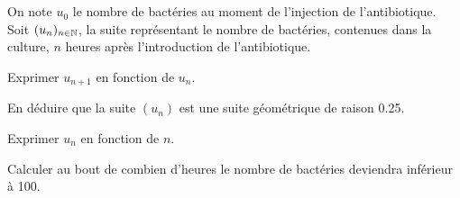 \subsection{\ }

On note $u_0$ le nombre de bactéries au moment de l'injection de l'antibiotique.
Soit $(u_n)_{n \in \mathbb{N}}$, la suite représentant le nombre de bactéries, contenues dans la culture, $n$ heures après l'introduction de l'antibiotique. 

\begin{questions}
	\question[1] Exprimer $u_{n+1}$ en fonction de $u_n$.
	
	\question[1] En déduire que la suite $(u_n)$ est une suite géométrique de raison \num{0.25}.
	
	\question[1] Exprimer $u_n$ en fonction de $n$.
	
	\question[2] Calculer au bout de combien d'heures le nombre de bactéries deviendra inférieur à 100. 
\end{questions}